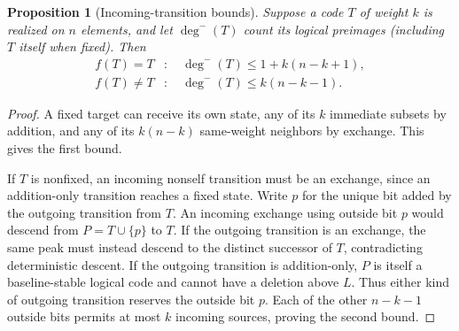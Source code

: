 \documentclass[12pt,letterpaper]{article}
\newtheorem{proposition}[theorem]{Proposition}
\theoremstyle{definition}\newtheorem{definition}[theorem]{Definition}
\theoremstyle{remark}\newtheorem{remark}[theorem]{Remark}
\begin{document}
\begin{proposition}[Incoming-transition bounds]\label{prop:fanin}
Suppose a code $T$ of weight $k$ is realized on $n$ elements, and let $\deg^-(T)$ count its logical preimages (including $T$ itself when fixed). Then
\begin{align}\label{eq:fanin}
 f(T)=T&:\quad\deg^-(T)\le1+k(n-k+1),\\
 f(T)\ne T&:\quad\deg^-(T)\le k(n-k-1).\nonumber
\end{align}
\end{proposition}
\begin{proof}
A fixed target can receive its own state, any of its $k$ immediate subsets by addition, and any of its $k(n-k)$ same-weight neighbors by exchange. This gives the first bound.

If $T$ is nonfixed, an incoming nonself transition must be an exchange, since an addition-only transition reaches a fixed state. Write $p$ for the unique bit added by the outgoing transition from $T$. An incoming exchange using outside bit $p$ would descend from $P=T\cup\{p\}$ to $T$. If the outgoing transition is an exchange, the same peak must instead descend to the distinct successor of $T$, contradicting deterministic descent. If the outgoing transition is addition-only, $P$ is itself a baseline-stable logical code and cannot have a deletion above $L$. Thus either kind of outgoing transition reserves the outside bit $p$. Each of the other $n-k-1$ outside bits permits at most $k$ incoming sources, proving the second bound.
\end{proof}
\end{document}
